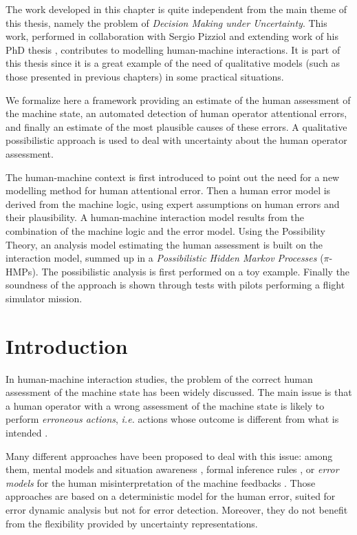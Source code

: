 The work developed in this chapter is quite independent 
from the main theme of this thesis, namely the problem of
\textit{Decision Making under Uncertainty}.
This work, performed in collaboration with Sergio Pizziol
and extending work of his PhD thesis \cite{SERGIOTHESIS}, 
contributes to modelling human-machine interactions.
It is part of this thesis since it is a great example of 
the need of qualitative models (such as those presented in previous chapters)
in some practical situations.

We formalize here a framework providing an estimate 
of the human assessment of the machine state, 
an automated detection of human operator attentional errors, 
and finally an estimate of the most plausible causes of these errors.
A qualitative possibilistic approach is used to deal 
with uncertainty about the human operator assessment. 

The human-machine context is first introduced to point out the need 
for a new modelling method for human attentional error.
Then a human error model is derived from the machine logic, using expert assumptions on human errors and their plausibility.
A human-machine interaction model results from the combination of the machine logic and the error model.
Using the Possibility Theory, an analysis model estimating the human assessment 
is built on the interaction model, summed up in a \textit{Possibilistic Hidden Markov Processes} ($\pi$-HMPs).
The possibilistic analysis is first performed on a toy example. 
Finally the soundness of the approach is shown through tests with pilots performing a flight simulator mission.


\section{Introduction}
\label{intro}
In human-machine interaction studies, the problem of the 
correct human assessment of the machine state has been widely discussed. 
The main issue is that a human operator with a wrong assessment of the 
machine state is likely to perform {\em erroneous actions}, \textit{i.e.} 
actions whose outcome is different from what is intended \cite{Joshi03}. 

Many different approaches have been proposed to deal with this issue: 
among them, mental models and situation awareness \cite{Endsley95,rushby99}, 
formal inference rules \cite{Obrien09}, or {\em error models} for the human 
misinterpretation of the machine feedbacks \cite{rushby02a}. Those approaches 
are based on a deterministic model for the human error, suited for error 
dynamic analysis but not for error detection. Moreover, they do not benefit 
from the flexibility provided by uncertainty representations.

